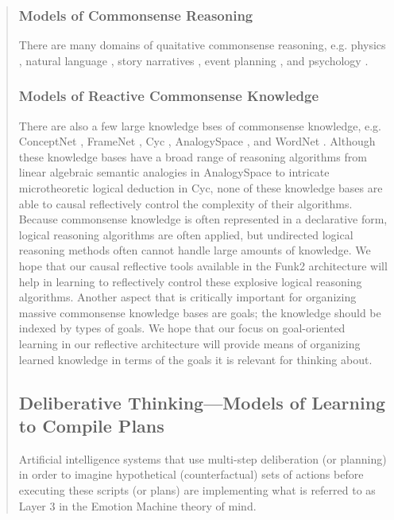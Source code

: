 \begin{quotation}
\subsubsection{Models of Commonsense Reasoning}

There are many domains of quaitative commonsense reasoning, e.g. physics \cite[]{forbus1994qpt}, natural language \cite[]{liu2004cra}, story narratives \cite[]{williams2005cas}, event planning \cite[]{smith2006mar}, and psychology \cite[]{gordon2008asm}.

\subsubsection{Models of Reactive Commonsense Knowledge}

There are also a few large knowledge bses of commonsense knowledge, e.g. ConceptNet \cite[]{liu2004cpc}, FrameNet \cite[]{980860}, Cyc \cite[]{79176}, AnalogySpace \cite[]{1502672}, and WordNet \cite[]{fellbaum1998wel}.
Although these knowledge bases have a broad range of reasoning algorithms from linear algebraic semantic analogies in AnalogySpace to intricate microtheoretic logical deduction in Cyc, none of these knowledge bases are able to causal reflectively control the complexity of their algorithms.
Because commonsense knowledge is often represented in a declarative form, logical reasoning algorithms are often applied, but undirected logical reasoning methods often cannot handle large amounts of knowledge.
We hope that our causal reflective tools available in the Funk2 architecture will help in learning to reflectively control these explosive logical reasoning algorithms.
Another aspect that is critically important for organizing massive commonsense knowledge bases are goals; the knowledge should be indexed by types of goals.
We hope that our focus on goal-oriented learning in our reflective architecture will provide means of organizing learned knowledge in terms of the goals it is relevant for thinking about.

\subsection{Deliberative Thinking---Models of Learning to Compile Plans}

Artificial intelligence systems that use multi-step deliberation (or planning) in order to imagine hypothetical (counterfactual) sets of actions before executing these scripts (or plans) are implementing what is referred to as Layer 3 in the Emotion Machine theory of mind.


\end{quotation}
